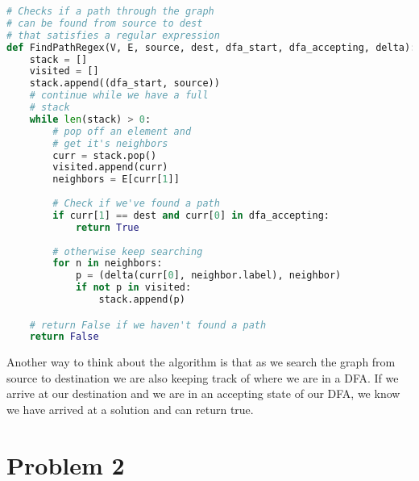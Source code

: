 \documentclass[11pt, letterpaper]{article}
\begin{document}
\begin{enumerate}
\begin{lstlisting}[language=python]
# Checks if a path through the graph
# can be found from source to dest
# that satisfies a regular expression
def FindPathRegex(V, E, source, dest, dfa_start, dfa_accepting, delta):
    stack = []
    visited = []
    stack.append((dfa_start, source))
    # continue while we have a full 
    # stack
    while len(stack) > 0:
        # pop off an element and 
        # get it's neighbors
        curr = stack.pop()
        visited.append(curr)
        neighbors = E[curr[1]]
    
        # Check if we've found a path
        if curr[1] == dest and curr[0] in dfa_accepting:
            return True
    
        # otherwise keep searching
        for n in neighbors:
            p = (delta(curr[0], neighbor.label), neighbor)
            if not p in visited:
                stack.append(p)

    # return False if we haven't found a path
    return False
\end{lstlisting}

\quad Another way to think about the algorithm is that as we search the graph from source to destination we are also keeping track of where we are in a DFA. If we arrive at our destination and we are in an accepting state of our DFA, we know we have arrived at a solution and can return true.

\end{enumerate}
\pagebreak

\section*{Problem 2}
\end{document}
